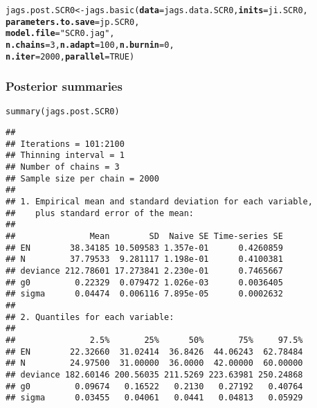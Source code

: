 \documentclass[color=usenames,dvipsnames]{beamer}\usepackage[]{graphicx}\usepackage[]{xcolor}
\makeatletter
\newcommand{\hlnum}[1]{\textcolor[rgb]{0.69,0.494,0}{#1}}%
\newcommand{\hlsng}[1]{\textcolor[rgb]{0.749,0.012,0.012}{#1}}%
\newcommand{\hldef}[1]{\textcolor[rgb]{0,0,0}{#1}}%
\newcommand{\hlkwb}[1]{\textcolor[rgb]{0,0.341,0.682}{#1}}%
\newcommand{\hlkwc}[1]{\textcolor[rgb]{0,0,0}{\textbf{#1}}}%
\newcommand{\hlkwd}[1]{\textcolor[rgb]{0.004,0.004,0.506}{#1}}%
\newenvironment{kframe}{%
 \def\at@end@of@kframe{}%
 \ifinner\ifhmode%
  \def\at@end@of@kframe{\end{minipage}}%
  \begin{minipage}{\columnwidth}%
 \fi\fi%
 \def\FrameCommand##1{\hskip\@totalleftmargin \hskip-\fboxsep
 \colorbox{shadecolor}{##1}\hskip-\fboxsep
     \hskip-\linewidth \hskip-\@totalleftmargin \hskip\columnwidth}%
 \MakeFramed {\advance\hsize-\width
   \@totalleftmargin\z@ \linewidth\hsize
   \@setminipage}}%
 {\par\unskip\endMakeFramed%
 \at@end@of@kframe}
\newenvironment{knitrout}{}{} %
\makeatother
\begin{document}
\begin{frame}[fragile]
\begin{knitrout}\scriptsize
{}\color{fgcolor}\begin{kframe}
\begin{alltt}
\hldef{jags.post.SCR0} \hlkwb{<-} \hlkwd{jags.basic}\hldef{(}\hlkwc{data}\hldef{=jags.data.SCR0,} \hlkwc{inits}\hldef{=ji.SCR0,}
                             \hlkwc{parameters.to.save}\hldef{=jp.SCR0,}
                             \hlkwc{model.file}\hldef{=}\hlsng{"SCR0.jag"}\hldef{,}
                             \hlkwc{n.chains}\hldef{=}\hlnum{3}\hldef{,} \hlkwc{n.adapt}\hldef{=}\hlnum{100}\hldef{,} \hlkwc{n.burnin}\hldef{=}\hlnum{0}\hldef{,}
                             \hlkwc{n.iter}\hldef{=}\hlnum{2000}\hldef{,} \hlkwc{parallel}\hldef{=}\hlnum{TRUE}\hldef{)}
\end{alltt}
\end{kframe}
\end{knitrout}
\end{frame}




\begin{frame}[fragile]
  \frametitle{Posterior summaries}
\begin{knitrout}\tiny
{}\color{fgcolor}\begin{kframe}
\begin{alltt}
\hlkwd{summary}\hldef{(jags.post.SCR0)}
\end{alltt}
\begin{verbatim}
## 
## Iterations = 101:2100
## Thinning interval = 1 
## Number of chains = 3 
## Sample size per chain = 2000 
## 
## 1. Empirical mean and standard deviation for each variable,
##    plus standard error of the mean:
## 
##               Mean        SD  Naive SE Time-series SE
## EN        38.34185 10.509583 1.357e-01      0.4260859
## N         37.79533  9.281117 1.198e-01      0.4100381
## deviance 212.78601 17.273841 2.230e-01      0.7465667
## g0         0.22329  0.079472 1.026e-03      0.0036405
## sigma      0.04474  0.006116 7.895e-05      0.0002632
## 
## 2. Quantiles for each variable:
## 
##               2.5%       25%      50%       75%     97.5%
## EN        22.32660  31.02414  36.8426  44.06243  62.78484
## N         24.97500  31.00000  36.0000  42.00000  60.00000
## deviance 182.60146 200.56035 211.5269 223.63981 250.24868
## g0         0.09674   0.16522   0.2130   0.27192   0.40764
## sigma      0.03455   0.04061   0.0441   0.04813   0.05929
\end{verbatim}
\end{kframe}
\end{knitrout}
\end{frame}
\end{document}
